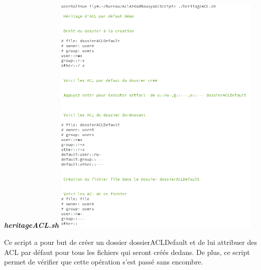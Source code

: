 \documentclass{article}
\begin{document}
\begin{center}
    \textbf{\textit{heritageACL.sh}}
\includegraphics[width=10cm]{images/heritageACL.png}
\end{center}
Ce script a pour but de créer un dossier dossierACLDefault et de lui attribuer des ACL par défaut pour tous les fichiers qui seront créés dedans. De plus, ce script permet de vérifier que cette opération s'est passé sans encombre.

\newpage
\end{document}
